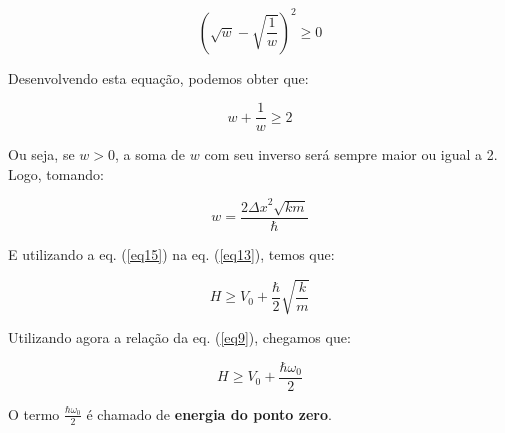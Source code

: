 \begin{equation}
    \left(\sqrt{w} - \sqrt{\frac{1}{w}} \right)^2 \geq 0   \label{eq14}
\end{equation}

Desenvolvendo esta equação, podemos obter que:

\begin{equation}
    w + \frac{1}{w} \geq 2   \label{eq15}
\end{equation}

Ou seja, se $w > 0$, a soma de $w$ com seu inverso será sempre maior ou igual a 2. Logo, tomando:

\begin{equation}
    w = \frac{2{\Delta x}^2 \sqrt{km}}{\hbar}   \label{eq16}
\end{equation}

E utilizando a eq. (\ref{eq15}) na eq. (\ref{eq13}), temos que:

\begin{equation}
    H \geq V_0 + \frac{\hbar}{2}\sqrt{\frac{k}{m}}   \label{eq17}
\end{equation}

Utilizando agora a relação da eq. (\ref{eq9}), chegamos que:

\begin{equation}
    H \geq V_0 + \frac{\hbar {\omega}_0}{2}   \label{eq18}
\end{equation}

O termo $\frac{\hbar {\omega}_0}{2}$ é chamado de \textbf{energia do ponto zero}.

